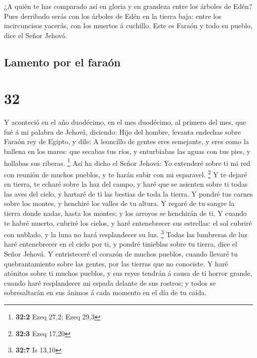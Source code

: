  ¿A quién te has comparado así en gloria y en grandeza
entre los árboles de Edén? Pues derribado serás con los árboles de Edén
en la tierra baja: entre los incircuncisos yacerás, con los muertos á
cuchillo. Este es Faraón y todo su pueblo, dice el Señor Jehová.

\hypertarget{lamento-por-el-farauxf3n}{%
\subsection{Lamento por el faraón}\label{lamento-por-el-farauxf3n}}

\hypertarget{section-31}{%
\section{32}\label{section-31}}

 Y aconteció en el año duodécimo, en el mes duodécimo, al
primero del mes, que fué á mí palabra de Jehová, diciendo: 
Hijo del hombre, levanta endechas sobre Faraón rey de Egipto, y dile: A
leoncillo de gentes eres semejante, y eres como la ballena en los mares:
que secabas tus ríos, y enturbiabas las aguas con tus pies, y hollabas
sus riberas. \footnote{\textbf{32:2} Ezeq 27,2; Ezeq 29,3} 
Así ha dicho el Señor Jehová: Yo extenderé sobre ti mi red con reunión
de muchos pueblos, y te harán subir con mi esparavel. \footnote{\textbf{32:3}
  Ezeq 17,20}  Y te dejaré en tierra, te echaré sobre la haz
del campo, y haré que se asienten sobre ti todas las aves del cielo, y
hartaré de ti las bestias de toda la tierra.  Y pondré tus
carnes sobre los montes, y henchiré los valles de tu altura.
 Y regaré de tu sangre la tierra donde nadas, hasta los
montes; y los arroyos se henchirán de ti.  Y cuando te habré
muerto, cubriré los cielos, y haré entenebrecer sus estrellas: el sol
cubriré con nublado, y la luna no hará resplandecer su luz. \footnote{\textbf{32:7}
  Is 13,10}  Todas las lumbreras de luz haré entenebrecer en
el cielo por ti, y pondré tinieblas sobre tu tierra, dice el Señor
Jehová.  Y entristeceré el corazón de muchos pueblos, cuando
llevaré tu quebrantamiento sobre las gentes, por las tierras que no
conociste.  Y haré atónitos sobre ti muchos pueblos, y sus
reyes tendrán á causa de ti horror grande, cuando haré resplandecer mi
espada delante de sus rostros; y todos se sobresaltarán en sus ánimos á
cada momento en el día de tu caída.


